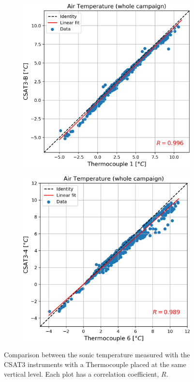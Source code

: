 \begin{figure}[!ht]
    \centering
    \begin{subfigure}[b]{0.48\textwidth}
        \includegraphics[width=\textwidth]{fig/chapter_4/csat3b_vs_T1.png}
      \label{fig:csat3b_vs_TC1}
    \end{subfigure}
    \quad
    \begin{subfigure}[b]{0.48\textwidth}
        \includegraphics[width=\textwidth]{fig/chapter_4/csat4_vs_T6.png}
        \label{fig:csat4_vs_TC6}
    \end{subfigure}
    \caption{Comparison between the sonic temperature measured with the CSAT3 instruments with a Thermocouple placed at the same vertical level. Each plot has a correlation coefficient, $R$.}
    \label{fig:csat_vs_TC}
\end{figure}

